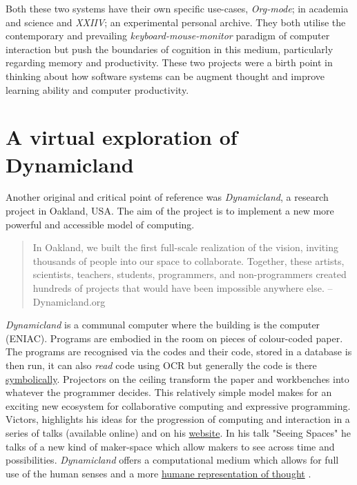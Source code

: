 \documentclass[12pt]{report}
\begin{document}
Both these two systems have their own specific use-cases, \emph{Org-mode}; in
academia and science and \emph{XXIIV}; an experimental personal archive. They both
utilise the contemporary and prevailing \emph{keyboard-mouse-monitor} paradigm
of computer interaction but push the boundaries of cognition in this medium,
particularly regarding memory and productivity. These two projects were a birth
point in thinking about how software systems can be augment thought and improve
learning ability and computer productivity.


\section{A virtual exploration of Dynamicland}
\label{sec:orgfad32e8}

Another original and critical point of reference was \emph{Dynamicland}, a research
project in Oakland, USA. The aim of the project is to implement a new more
powerful and accessible model of computing.

\begin{quote}


In Oakland, we built the first full-scale realization of the vision, inviting
thousands of people into our space to collaborate. Together, these artists,
scientists, teachers, students, programmers, and non-programmers created
hundreds of projects that would have been impossible anywhere else.
-- Dynamicland.org 
\end{quote}


\emph{Dynamicland} is a communal computer where the building is the computer (ENIAC).
Programs are embodied in the room on pieces of colour-coded paper. The programs
are recognised via the codes and their code, stored in a database is then run,
it can also \emph{read} code using OCR but generally the code is there \href{https://thenewstack.io/dynamicland-rethinks-computer-interfaces/}{symbolically}.
Projectors on the ceiling transform the paper and workbenches into whatever the
programmer decides. This relatively simple model makes for an exciting new
ecosystem for collaborative computing and expressive programming. Victors,
highlights his ideas for the progression of computing and interaction in a
series of talks (available online) and on his \href{http://worrydream.com}{website}. In his talk "Seeing
Spaces" he talks of a new kind of maker-space which allow makers to see across
time and possibilities. \emph{Dynamicland} offers a computational medium which allows
for full use of the human senses and a more \href{https://vimeo.com/115154289}{humane representation of thought}
\cite{VictorKayDynamicLand}. \\
\end{document}
